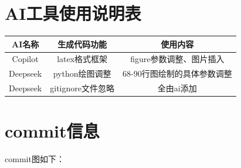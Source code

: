 \documentclass[12pt,a4paper]{article}
\begin{document}
\section{AI工具使用说明表}
\begin{table}[!htbp]
    \centering
    \begin{tabular}{|c|c|c|}
        \hline
        \textbf{AI名称} & \textbf{生成代码功能} & \textbf{使用内容} \\
        \hline
        Copilot & latex格式框架 & figure参数调整、图片插入\\
        \hline
        Deepseek & python绘图调整 & 68-90行图绘制的具体参数调整\\
        \hline
        Deepseek & gitignore文件忽略 & 全由ai添加\\
        \hline
\end{tabular}
\end{table}
\section{commit信息}
commit图如下：
\end{document}
